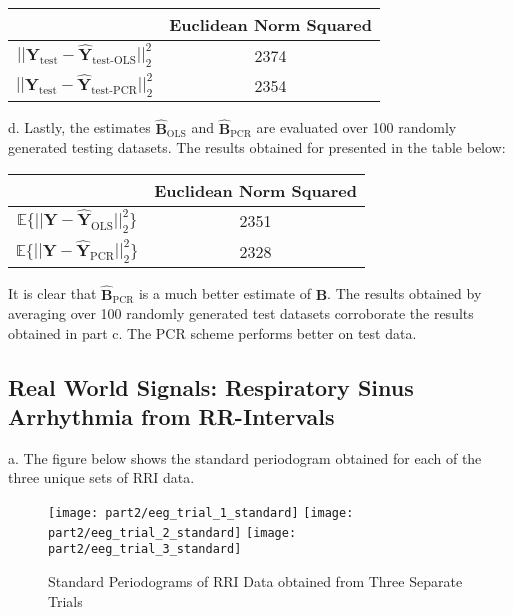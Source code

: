 \begin{table}[H]
\tabulinesep=0.9mm
\centering
\begin{tabu}{c|c|}
                                           & Euclidean Norm Squared \\ \hline
{}	& 2374		\\ \hline
{}	& 2354		\\ \hline
\end{tabu}
\end{table}


\noindent{}d. Lastly, the estimates $\hat{\textbf{B}}_{\text{OLS}}$ and $\hat{\textbf{B}}_{\text{PCR}}$ are evaluated over 100 randomly generated testing datasets. The results obtained for presented in the table below:

\begin{table}[H]
\tabulinesep=0.9mm
\centering
\begin{tabu}{c|c|}
                                           & Euclidean Norm Squared \\ \hline
{}	& 2351		\\ \hline
{}	& 2328		\\ \hline
\end{tabu}
\end{table}

\noindent{}It is clear that $\hat{\textbf{B}}_{\text{PCR}}$ is a much better estimate of $\textbf{B}$. The results obtained by averaging over 100 randomly generated test datasets corroborate the results obtained in part c. The PCR scheme performs better on test data.

\newpage
\subsection{Real World Signals: Respiratory Sinus Arrhythmia from RR-Intervals}

\noindent{}a. The figure below shows the standard periodogram obtained for each of the three unique sets of RRI data.

\begin{figure}[H]
\centering{}
\texttt{[image: part2/eeg\_trial\_1\_standard]}
\texttt{[image: part2/eeg\_trial\_2\_standard]}
\texttt{[image: part2/eeg\_trial\_3\_standard]}
\caption{Standard Periodograms of RRI Data obtained from Three Separate Trials}
\end{figure}

